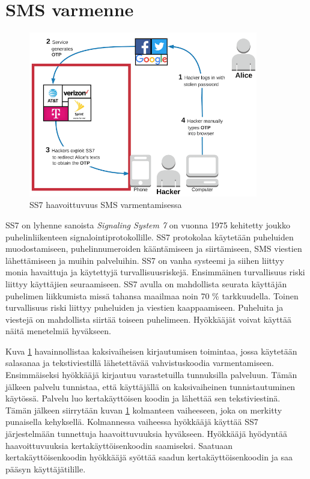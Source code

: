 \section{SMS varmenne}
\begin{figure}[ht]
    \centering
    \includegraphics[width=10cm]{template/figures/SS7 attack vulnerable.png}
    \caption{SS7 haavoittuvuus SMS varmentamisessa \citep{2FA_SMS}}
    \label{fig:ss7SMSM}
\end{figure}

SS7 on lyhenne sanoista \emph{Signaling System 7} on vuonna 1975 kehitetty joukko puhelinliikenteen signalointiprotokollille. SS7 protokolaa käytetään puheluiden muodostamiseen, puhelinnumeroiden kääntämiseen ja siirtämiseen, SMS viestien lähettämiseen ja muihin palveluihin. SS7 on vanha systeemi ja siihen liittyy monia havaittuja ja käytettyjä turvallisuusriskejä. Ensimmäinen turvallisuus riski liittyy käyttäjien seuraamiseen. SS7 avulla on mahdollista seurata käyttäjän puhelimen liikkumista missä tahansa maailmaa noin 70 \% tarkkuudella. Toinen turvallisuus riski liittyy puheluiden ja viestien kaappaamiseen. Puheluita ja viestejä on mahdollista siirtää toiseen puhelimeen. Hyökkääjät voivat käyttää näitä menetelmiä hyväkseen. \citep{ss7} 

Kuva \ref{fig:ss7SMSM} havainnollistaa kaksivaiheisen kirjautumisen toimintaa, jossa käytetään salasanaa ja tekstiviestillä lähetettävää vahvistuskoodia varmentamiseen. Ensimmäiseksi hyökkääjä kirjautuu varastetuilla tunnuksilla palveluun. Tämän jälkeen palvelu tunnistaa, että käyttäjällä on kaksivaiheinen tunnistautuminen käytössä. Palvelu luo kertakäyttöisen koodin ja lähettää sen tekstiviestinä. Tämän jälkeen siirrytään kuvan \ref{fig:ss7SMSM}  kolmanteen vaiheeseen, joka on merkitty punaisella kehyksellä. Kolmannessa vaiheessa hyökkääjä käyttää SS7 järjestelmään tunnettuja haavoittuvuuksia hyväkseen. Hyökkääjä hyödyntää haavoittuvuuksia kertakäyttöisenkoodin saamiseksi. Saatuaan kertakäyttöisenkoodin hyökkääjä syöttää saadun kertakäyttöisenkoodin ja saa pääsyn käyttäjätilille. 


